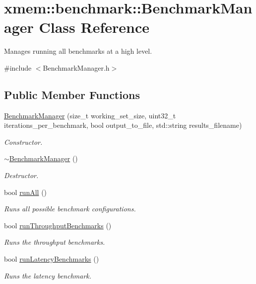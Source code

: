 \hypertarget{classxmem_1_1benchmark_1_1_benchmark_manager}{}\section{xmem\+:\+:benchmark\+:\+:Benchmark\+Manager Class Reference}
\label{classxmem_1_1benchmark_1_1_benchmark_manager}


Manages running all benchmarks at a high level.  




{\ttfamily \#include $<$Benchmark\+Manager.\+h$>$}

\subsection*{Public Member Functions}
\begin{DoxyCompactItemize}
\item 
\hyperlink{classxmem_1_1benchmark_1_1_benchmark_manager_a1990c0e85b05764d7819b6903d495ee1}{Benchmark\+Manager} (size\+\_\+t working\+\_\+set\+\_\+size, uint32\+\_\+t iterations\+\_\+per\+\_\+benchmark, bool output\+\_\+to\+\_\+file, std\+::string results\+\_\+filename)
\begin{DoxyCompactList}\small\item\em Constructor. \end{DoxyCompactList}\item 
\hypertarget{classxmem_1_1benchmark_1_1_benchmark_manager_ab1540ca105b7e3c4f5fe96aeb59cc649}{}\hyperlink{classxmem_1_1benchmark_1_1_benchmark_manager_ab1540ca105b7e3c4f5fe96aeb59cc649}{$\sim$\+Benchmark\+Manager} ()\label{classxmem_1_1benchmark_1_1_benchmark_manager_ab1540ca105b7e3c4f5fe96aeb59cc649}

\begin{DoxyCompactList}\small\item\em Destructor. \end{DoxyCompactList}\item 
bool \hyperlink{classxmem_1_1benchmark_1_1_benchmark_manager_a7b7f4694586af20262d2f3ebe3750d86}{run\+All} ()
\begin{DoxyCompactList}\small\item\em Runs all possible benchmark configurations. \end{DoxyCompactList}\item 
bool \hyperlink{classxmem_1_1benchmark_1_1_benchmark_manager_a47b21d3d8a1e1be93e7efd35a3374b0c}{run\+Throughput\+Benchmarks} ()
\begin{DoxyCompactList}\small\item\em Runs the throughput benchmarks. \end{DoxyCompactList}\item 
bool \hyperlink{classxmem_1_1benchmark_1_1_benchmark_manager_ac515058049ec46df410e4e8e7d858019}{run\+Latency\+Benchmarks} ()
\begin{DoxyCompactList}\small\item\em Runs the latency benchmark. \end{DoxyCompactList}\end{DoxyCompactItemize}


